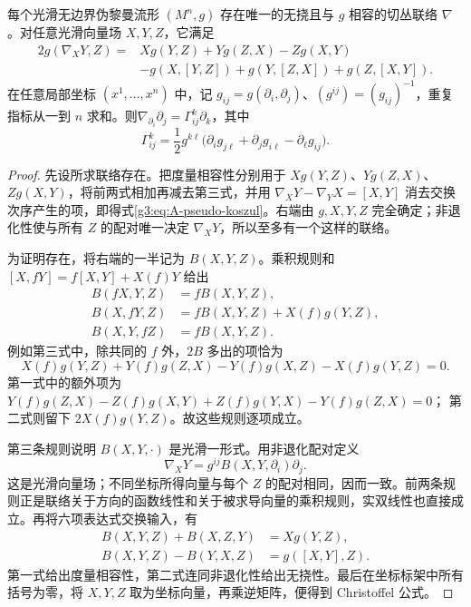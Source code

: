 \begin{theorem}\label{g3:thm:A-pseudo-levi-civita}
	每个光滑无边界伪黎曼流形 \((M^n,g)\) 存在唯一的无挠且与 \(g\) 相容的切丛联络 \(\nabla\)。对任意光滑向量场 \(X,Y,Z\)，它满足
	\begin{equation}\label{g3:eq:A-pseudo-koszul}
	\begin{aligned}
		2g(\nabla_XY,Z)
		={}&Xg(Y,Z)+Yg(Z,X)-Zg(X,Y)\\
		&-g(X,[Y,Z])+g(Y,[Z,X])+g(Z,[X,Y]).
	\end{aligned}
	\end{equation}
	在任意局部坐标 \((x^1,\ldots,x^n)\) 中，记 \(g_{ij}=g(\partial_i,\partial_j)\)、\((g^{ij})=(g_{ij})^{-1}\)，重复指标从一到 \(n\) 求和。则\(\nabla_{\partial_i}\partial_j=\Gamma^k_{ij}\partial_k\)，其中
	\begin{equation}\label{g3:eq:A-pseudo-christoffel}
		\Gamma^k_{ij}
		=\frac12g^{k\ell}
		\bigl(\partial_i g_{j\ell}+\partial_jg_{i\ell}
		             -\partial_\ell g_{ij}\bigr).
	\end{equation}
\end{theorem}
\begin{proof}
	先设所求联络存在。把度量相容性分别用于 \(Xg(Y,Z)\)、\(Yg(Z,X)\)、\(Zg(X,Y)\)，将前两式相加再减去第三式，并用
	\(\nabla_XY-\nabla_YX=[X,Y]\) 消去交换次序产生的项，即得式\eqref{g3:eq:A-pseudo-koszul}。右端由 \(g,X,Y,Z\) 完全确定；非退化性使与所有 \(Z\) 的配对唯一决定 \(\nabla_XY\)，所以至多有一个这样的联络。

	为证明存在，将右端的一半记为 \(B(X,Y,Z)\)。乘积规则和
	\([X,fY]=f[X,Y]+X(f)Y\) 给出
	\[
	\begin{aligned}
		B(fX,Y,Z)&=fB(X,Y,Z),\\
		B(X,fY,Z)&=fB(X,Y,Z)+X(f)g(Y,Z),\\
		B(X,Y,fZ)&=fB(X,Y,Z).
	\end{aligned}
	\]
	例如第三式中，除共同的 \(f\) 外，\(2B\) 多出的项恰为
	\[
		X(f)g(Y,Z)+Y(f)g(Z,X)
		-Y(f)g(X,Z)-X(f)g(Y,Z)=0.
	\]
	第一式中的额外项为
	\(Y(f)g(Z,X)-Z(f)g(X,Y)+Z(f)g(Y,X)-Y(f)g(Z,X)=0\)；
	第二式则留下 \(2X(f)g(Y,Z)\)。故这些规则逐项成立。

	第三条规则说明 \(B(X,Y,\cdot)\) 是光滑一形式。用非退化配对定义
	\[
		\nabla_XY=g^{ij}B(X,Y,\partial_i)\partial_j.
	\]
	这是光滑向量场；不同坐标所得向量与每个 \(Z\) 的配对相同，因而一致。前两条规则正是联络关于方向的函数线性和关于被求导向量的乘积规则，实双线性也直接成立。再将六项表达式交换输入，有
	\[
	\begin{aligned}
		B(X,Y,Z)+B(X,Z,Y)&=Xg(Y,Z),\\
		B(X,Y,Z)-B(Y,X,Z)&=g([X,Y],Z).
	\end{aligned}
	\]
	第一式给出度量相容性，第二式连同非退化性给出无挠性。最后在坐标标架中所有括号为零，将 \(X,Y,Z\) 取为坐标向量，再乘逆矩阵，便得到 Christoffel 公式。
\end{proof}

